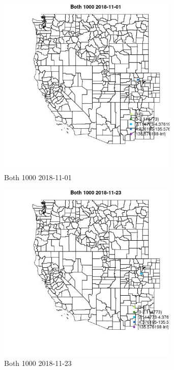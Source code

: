 \begin{figure} 
\centering  
\includegraphics[width=0.77\textwidth]{Code_Outputs/Report_ML_input_PM25_Step4_part_e_de_duplicated_aves_MapObsBoth_10002018-11-01.jpg} 
\caption{\label{fig:Report_ML_input_PM25_Step4_part_e_de_duplicated_avesMapObsBoth_10002018-11-01}Both 1000 2018-11-01} 
\end{figure} 
 

\begin{figure} 
\centering  
\includegraphics[width=0.77\textwidth]{Code_Outputs/Report_ML_input_PM25_Step4_part_e_de_duplicated_aves_MapObsBoth_10002018-11-23.jpg} 
\caption{\label{fig:Report_ML_input_PM25_Step4_part_e_de_duplicated_avesMapObsBoth_10002018-11-23}Both 1000 2018-11-23} 
\end{figure} 
 

